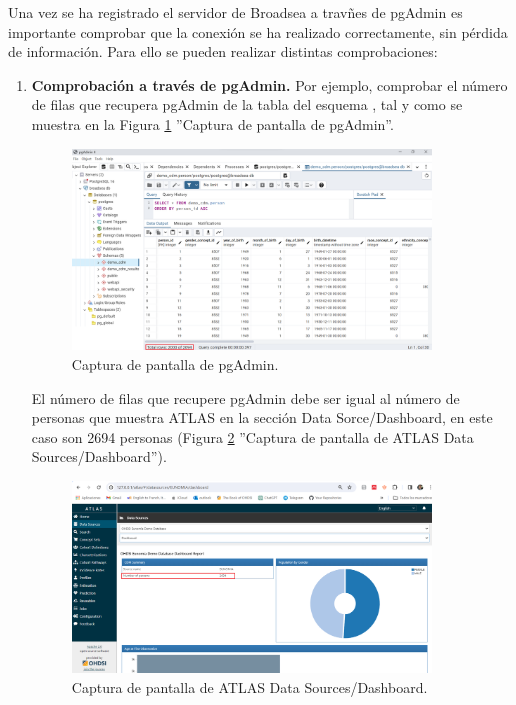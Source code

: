 Una vez se ha registrado el servidor de Broadsea a travñes de pgAdmin es importante comprobar que la conexión se ha realizado correctamente, sin pérdida de información. Para ello se pueden realizar distintas comprobaciones:


\begin{enumerate}[label=\alph*]

    \item \textbf{Comprobación a través de pgAdmin.} Por ejemplo, comprobar el número de filas que recupera pgAdmin de la tabla  del esquema , tal y como se muestra en la Figura \ref{fig:pgAdmin} ''Captura de pantalla de pgAdmin''.

    \begin{figure}[H]
    \centering
    \includegraphics[width=0.90\textwidth]{figures/pgAdmin.png}
     \caption{Captura de pantalla de pgAdmin.}
    \label{fig:pgAdmin}
    \end{figure}

    El número de filas que recupere pgAdmin debe ser igual al número de personas que muestra ATLAS en la sección Data Sorce/Dashboard, en este caso son 2694 personas (Figura \ref{fig:dashboardEJ} ''Captura de pantalla de ATLAS Data Sources/Dashboard'').

    \begin{figure}[H]
    \centering
    \includegraphics[width=0.90\textwidth]{figures/dashboardEJ.png}
     \caption{Captura de pantalla de ATLAS Data Sources/Dashboard.}
    \label{fig:dashboardEJ}
    \end{figure}


\end{enumerate}
